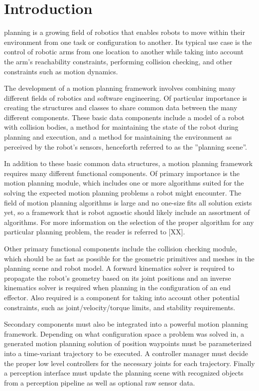 \documentclass[10pt,journal,compsoc]{joser1}
\begin{document}
\section{Introduction}
 {planning is a growing field of robotics that enables robots to move within their environment from one task or configuration to another. Its typical use case is the control of robotic arms from one location to another while taking into account the arm's reachability constraints, performing collision checking, and other constraints such as motion dynamics. 

The development of a motion planning framework involves combining many different fields of robotics and software engineering. Of particular importance is creating the structures and classes to share common data between the many different components. These basic data components include a model of a robot with collision bodies, a method for maintaining the state of the robot during planning and execution, and a method for maintaining the environment as perceived by the robot's sensors, henceforth referred to as the ''planning scene''. 

In addition to these basic common data structures, a motion planning framework requires many different functional components. Of primary importance is the motion planning module, which includes one or more algorithms suited for the solving the expected motion planning problems a robot might encounter. The field of motion planning algorithms is large and no one-size fits all solution exists yet, so a framework that is robot agnostic should likely include an assortment of algorithms. For more information on the selection of the proper algorithm for any particular planning problem, the reader is referred to [XX].

Other primary functional components include the collision checking module, which should be as fast as possible for the geometric primitives and meshes in the planning scene and robot model. A forward kinematics solver is required to propagate the robot's geometry based on its joint positions and an inverse kinematics solver is required when planning in the configuration of an end effector. Also required is a component for taking into account other potential constraints, such as joint/velocity/torque limits, and stability requirements. 

Secondary components must also be integrated into a powerful motion planning framework. Depending on what configuration space a problem was solved in, a generated motion planning solution of position waypoints must be parameterized into a time-variant trajectory to be executed. A controller manager must decide the proper low level controllers for the necessary joints for each trajectory. Finally a perception interface must update the planning scene with recognized objects from a perception pipeline as well as optional raw sensor data.

}
\end{document}
